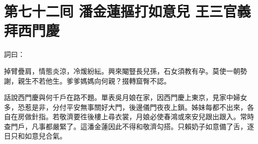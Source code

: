 
\chapter*{第七十二囘 潘金蓮摳打如意兒 王三官義拜西門慶}


詞曰：

\begin{myquote}
掉臂疊肩，情態炎涼，冷煖紛紜。興來閹豎長兒孫，石女須教有孕。莫使一朝勢謝，親生不若他生。爹爹媽媽向何親？掇轉窟臀不認。

\end{myquote}

話說西門慶與何千戶在路不題。單表吳月娘在家，因西門慶上東京，見家中婦女多，恐惹是非，分付平安無事關好大門，後邊儀門夜夜上鎖。姊妹每都不出來，各自在房做針指。若敬濟要徃後樓上尋衣裳，月娘必使春鴻或來安兒跟出跟入。常時查門戶，凡事都嚴緊了。這潘金蓮因此不得和敬濟勾搭。只賴奶子如意備了舌，逐日只和如意兒合氣。

